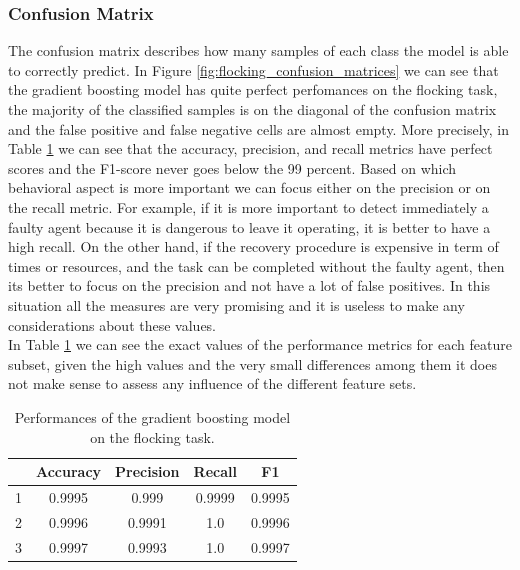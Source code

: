 \documentclass[../../Thesis.tex]{subfiles}
\begin{document}
			\subsubsection{Confusion Matrix}
				The confusion matrix describes how many samples of each class the model is able to correctly predict. In Figure \ref{fig:flocking_confusion_matrices} we can see that the gradient boosting model has quite perfect perfomances on the flocking task, the majority of the classified samples is on the diagonal of the confusion matrix and the false positive and false negative cells are almost empty. More precisely, in Table \ref{tab:flocking_gboost_perf_values} we can see that the accuracy, precision, and recall metrics have perfect scores and the F1-score never goes below the 99 percent. Based on which behavioral aspect is more important we can focus either on the precision or on the recall metric. For example, if it is more important to detect immediately a faulty agent because it is dangerous to leave it operating, it is better to have a high recall. On the other hand, if the recovery procedure is expensive in term of times or resources, and the task can be completed without the faulty agent, then its better to focus on the precision and not have a lot of false positives. In this situation all the measures are very promising and it is useless to make any considerations about these values. \\
				In Table \ref{tab:flocking_gboost_perf_values} we can see the exact values of the performance metrics for each feature subset, given the high values and the very small differences among them it does not make sense to assess any influence of the different feature sets.
				\begin{table}
					\center
					\setlength\tabcolsep{0.5em}
					\begin{tabular}{|ccccc|}
						\hline
						\rowcolor{bluepoli!40}
						\multicolumn{1}{|c}{\textbf{Feature Set}} &  \textbf{Accuracy} & \textbf{Precision} & \textbf{Recall} & \textbf{F1}\\ 
						\hline
						1 & 0.9995 & 0.999 & 0.9999 & 0.9995 \\
						\hline
						2 & 0.9996 & 0.9991 & 1.0 & 0.9996 \\
						\hline
						3 & 0.9997 & 0.9993 & 1.0 & 0.9997 \\
						\hline
					\end{tabular}
					\caption{Performances of the gradient boosting model on the flocking task.}
					\label{tab:flocking_gboost_perf_values}
				\end{table}
\end{document}
